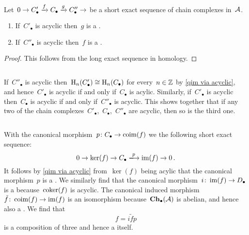 \section{}



\begin{lemma}
  \label{qim via acyclic}
  Let~$0 \to C'_\bullet \xrightarrow{f} C_\bullet \xrightarrow{g} C''_\bullet \to $ be a short exact sequence of chain complexes in~$\mathcal{A}$.
  \begin{enumerate}
    \item
      If~$C'_\bullet$ is acyclic then~$g$ is a {\qim}.
    \item
      If~$C''_\bullet$ is acyclic then~$f$ is a {\qim}.
  \end{enumerate}
\end{lemma}


\begin{proof}
  This follows from the long exact sequence in homology.
\end{proof}





\subsection{}

If~$C''_\bullet$ is acyclic then~$\operatorname{H}_n(C'_\bullet) \cong \operatorname{H}_n(C_\bullet)$ for every~$n \in \mathbb{Z}$ by \cref{qim via acyclic}, and hence~$C'_\bullet$ is acyclic if and only if~$C_\bullet$ is acylic.
Similarly, if~$C'_\bullet$ is acyclic then~$C_\bullet$ is acyclic if and only if~$C''_\bullet$ is acyclic.
This shows together that if any two of the chain complexes~$C'_\bullet$,~$C_\bullet$,~$C''_\bullet$ are acyclic, then so is the third one.





\subsection{}

With the canonical morphism~$p \colon C_\bullet \to \operatorname{coim}(f)$ we the following short exact sequence:
\[
  0
  \to
  \ker(f)
  \to
  C_\bullet
  \xlongto{p}
  \im(f)
  \to
  0 \,.
\]
It follows by \cref{qim via acyclic} from~$\ker(f)$ being acylic that the canonical morphism~$p$ is a {\qim}.
We similarly find that the canonical morphism~$i \colon \operatorname{im}(f) \to D_\bullet$ is a {\qim} because~$\operatorname{coker}(f)$ is acyclic.
The canonical induced morphism~$\tilde{f} \colon \operatorname{coim}(f) \to \operatorname{im}(f)$ is an isomorphism because~$\mathbf{Ch}_\bullet(\mathcal{A})$ is abelian, and hence also a {\qim}.
We find that
\[
    f
  = i \tilde{f} p
\]
is a composition of three {\qim} and hence a {\qim} itself.





